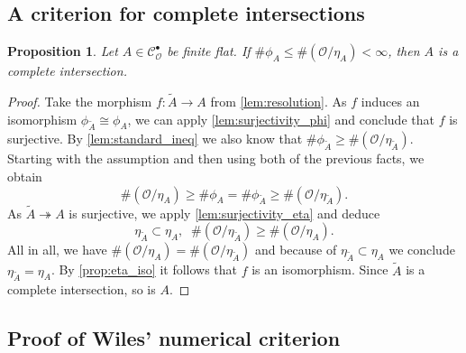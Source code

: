 \documentclass{article}
\theoremstyle{plain}%
\newtheorem{proposition}[theorem]{Proposition}
\theoremstyle{definition}
\theoremstyle{remark}
\newcommand{\cob}{\mathcal{C}_\mathcal{O}^\bullet}
\begin{document}
\subsection{A criterion for complete intersections}

\begin{proposition}\textup{\cite[theorem 5.27]{Darmon1995}}\label{prop:criterionCI}
    Let \(A \in \cob\) be finite flat. If \(\# \phi_A \leq \#(\mathcal{O}/\eta_A) < \infty\), 
    then \(A\) is a complete intersection.
\end{proposition}
\begin{proof}
    Take the morphism \(f\colon \tilde{A} \to A\) from \cref{lem:resolution}.
    As \(f\) induces an isomorphism \(\phi_{\tilde{A}} \cong \phi_A\), 
    we can apply \cref{lem:surjectivity_phi} and conclude that \(f\) is surjective.
    By \cref{lem:standard_ineq} we also know that \(\#\phi_{\tilde{A}} \geq \#(\mathcal{O}/\eta_{\tilde{A}})\).
    Starting with the assumption and then using both of the previous facts, we obtain
    \[
        \#(\mathcal{O}/\eta_A) \geq \#\phi_A = \#\phi_{\tilde{A}} \geq \#(\mathcal{O}/\eta_{\tilde{A}}).
    \]
    As \(\tilde{A} \twoheadrightarrow A\) is surjective, we apply \cref{lem:surjectivity_eta} 
    and deduce 
    \[
        \eta_{\tilde{A}} \subset \eta_A, \;\; \#(\mathcal{O}/\eta_{\tilde{A}}) \geq \#(\mathcal{O}/\eta_A).
    \]
    All in all, we have \(\#(\mathcal{O}/\eta_A) = \#(\mathcal{O}/\eta_{\tilde{A}})\) and because of
    \(\eta_{\tilde{A}} \subset \eta_A\) we conclude \(\eta_{\tilde{A}} = \eta_A\).
    By \cref{prop:eta_iso} it follows that \(f\) is an isomorphism.
    Since \(\tilde{A}\) is a complete intersection, so is \(A\).
\end{proof}

\subsection{Proof of Wiles' numerical criterion}
\end{document}
